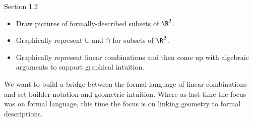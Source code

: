 \documentclass{problemset}
\begin{document}
\begin{lesson}

	Section 1.2

	\begin{itemize}
		\item Draw pictures of formally-described subsets of $\R^2$.
		\item Graphically represent $\cup$ and $\cap$ for subsets of $\R^2$.
		\item Graphically represent linear combinations and then come up with
			algebraic arguments to support graphical intuition.
	\end{itemize}


	We want to build a bridge between the formal language of linear combinations
	and set-builder notation and geometric intuition. Where as last time
	the focus was on formal language, this time the focus is on linking geometry
	to formal descriptions.


\end{lesson}
\end{document}
